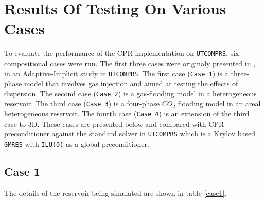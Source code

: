 \chapter{Results Of Testing On Various Cases}
To evaluate the performance of the CPR implementation on \texttt{UTCOMPRS}, six compositional cases were run. 
The first three cases were originaly presented in \cite{fernandes}, in an Adaptive-Implicit study in \texttt{UTCOMPRS}. 
The first case (\texttt{Case 1}) is a three-phase model that involves gas injection and aimed 
at testing the effects of dispersion. The second case (\texttt{Case 2}) is a gas-flooding model in 
a heterogeneous reservoir. The third case (\texttt{Case 3}) is a four-phase $CO_{2}$ flooding model 
in an areal heterogeneous reservoir. The fourth case (\texttt{Case 4}) is an extension of the third case to 3D. 
These cases are presented below and compared with CPR preconditioner against
the standard solver in \texttt{UTCOMPRS} which is a Krylov based \texttt{GMRES} with \texttt{ILU(0)} as a global
preconditioner. 

\section{Case 1}
The details of the reservoir being simulated are shown in table \ref{case1}. 

